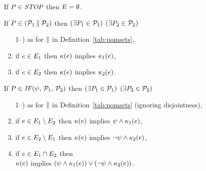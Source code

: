 \begin{definition}$\phantom{\;}$\par
  \label{tab:pomsets-pre}
  
  \noindent
  If $\aPS\SB0\in\sSTOP$ then $\aEvs\SB0 = \emptyset$.


  \noindent
  If $\aPS\SB0 \in (\aPSS_1\sPAR\aPSS_2)$ then
  $(\exists\aPS_1\in\aPSS_1)$ $(\exists\aPS_2\in\aPSS_2)$
\begin{enumerate}
     \setcounter{enumi}{\value{pomsetParDisjointCount}}
  \item[1--\thepomsetParDisjointCount)] as for $\sPAR$ in Definition~\ref{tab:pomsets},
  \item if $\aEv\in\aEvs_1$ then $\labelingForm\SB0(\aEv)$ implies $\labelingForm_1(\aEv)$,
  \item if $\aEv\in\aEvs_2$ then $\labelingForm\SB0(\aEv)$ implies $\labelingForm_2(\aEv)$.
    \setcounter{pomsetPreParCount}{\value{enumi}}
  \end{enumerate}

  \noindent
  If $\aPS\SB0 \in \sIF{\bForm}\sTHEN\aPSS_1\sELSE\aPSS_2\sFI$ then
  $(\exists\aPS_1\in\aPSS_1)$ $(\exists\aPS_2\in\aPSS_2)$
  \begin{enumerate}
  \setcounter{enumi}{\value{pomsetParCount}}
  \item[1--\thepomsetParCount)] as for $\sPAR$  in
    Definition~\ref{tab:pomsets} (ignoring disjointness),
  \item if $\aEv\in\aEvs_1\setminus\aEvs_2$ then $\labelingForm\SB0(\aEv)$ implies $\bForm\land\labelingForm_1(\aEv)$,
  \item if $\aEv\in\aEvs_2\setminus\aEvs_1$ then $\labelingForm\SB0(\aEv)$ implies $\neg\bForm\land\labelingForm_2(\aEv)$, 
  \item if $\aEv\in\aEvs_1\cap\aEvs_2$ then\\ $\labelingForm\SB0(\aEv)$ implies $(\bForm\land\labelingForm_1(\aEv))\lor(\neg\bForm\land\labelingForm_2(\aEv))$.
    \setcounter{pomsetPreIfCount}{\value{enumi}}
  \end{enumerate}


\end{definition}
